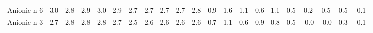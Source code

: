 \documentclass[preprint,3p,9pt,times,onecolumn]{elsarticle}
\begin{document}
\begin{table}
{\begin{tabular}{| c || cccccccccccccccccccc |}
Anionic n-6    & 3.0        & 2.8        & 2.9        & 3.0        & 2.9        & 2.7        & 2.7        & 2.7        & 2.7        & 2.8        & 0.9        & 1.6        & 1.1        & 0.6        & 1.1        & 0.5        & 0.2        & 0.5        & 0.5        & -0.1       \\
Anionic n-3    & 2.7        & 2.8        & 2.8        & 2.8        & 2.7        & 2.5        & 2.6        & 2.6        & 2.6        & 2.6        & 0.7        & 1.1        & 0.6        & 0.9        & 0.8        & 0.5        & -0.0       & -0.0       & 0.3        & -0.1       \\        \hline

\end{tabular}}
\end{table}

\end{document}
